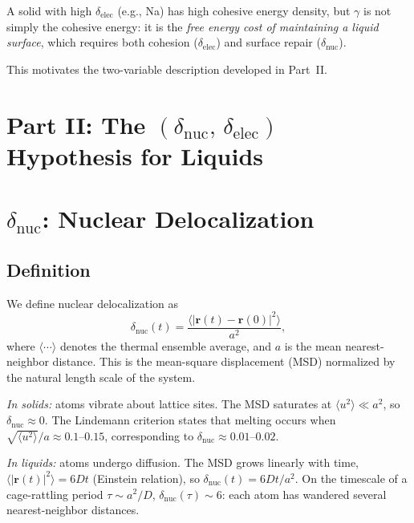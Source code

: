\documentclass[twocolumn,showpacs,preprintnumbers,amsmath,amssymb,prb]{revtex4-2}
\begin{document}
A solid with high $\delta_\mathrm{elec}$ (e.g., Na) has
high cohesive energy density, but $\gamma$ is not simply
the cohesive energy: it is the \emph{free energy cost of
maintaining a liquid surface}, which requires both cohesion
($\delta_\mathrm{elec}$) and surface repair
($\delta_\mathrm{nuc}$).

This motivates the two-variable description developed
in Part~II.



\section*{Part II: The $(\delta_\mathrm{nuc},\,\delta_\mathrm{elec})$
Hypothesis for Liquids}

\section{$\delta_\mathrm{nuc}$: Nuclear Delocalization}
\label{sec:delta_nuc}

\subsection{Definition}

We define nuclear delocalization as
\begin{equation}
  \delta_\mathrm{nuc}(t) =
  \frac{\langle |\mathbf{r}(t) - \mathbf{r}(0)|^2 \rangle}{a^2},
  \label{eq:delta_nuc}
\end{equation}
where $\langle \cdots \rangle$ denotes the thermal ensemble
average, and $a$ is the mean nearest-neighbor distance.
This is the mean-square displacement (MSD) normalized by
the natural length scale of the system.

\emph{In solids:} atoms vibrate about lattice sites.
The MSD saturates at $\langle u^2 \rangle \ll a^2$,
so $\delta_\mathrm{nuc} \approx 0$.
The Lindemann criterion states that melting occurs when
$\sqrt{\langle u^2 \rangle}/a \approx 0.1$--$0.15$,
corresponding to $\delta_\mathrm{nuc} \approx 0.01$--$0.02$.

\emph{In liquids:} atoms undergo diffusion.
The MSD grows linearly with time,
$\langle |\mathbf{r}(t)|^2 \rangle = 6Dt$
(Einstein relation), so
$\delta_\mathrm{nuc}(t) = 6Dt/a^2$.
On the timescale of a cage-rattling period
$\tau \sim a^2/D$,
$\delta_\mathrm{nuc}(\tau) \sim 6$:
each atom has wandered several nearest-neighbor distances.
\end{document}
